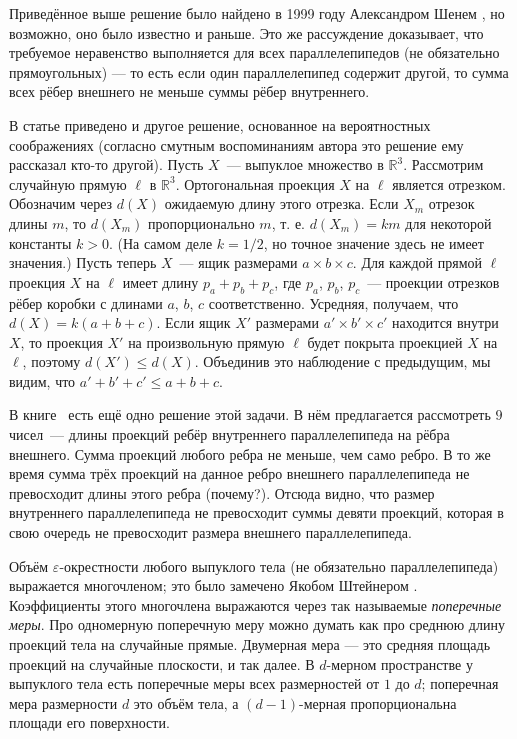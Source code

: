\begin{addedbytheeditors}
Приведённое выше решение было найдено в 1999 году Александром Шенем \cite{shen}, но возможно, оно было известно и раньше.
Это же рассуждение доказывает, что требуемое неравенство выполняется для всех параллелепипедов (не обязательно прямоугольных) --- то есть если один параллелепипед содержит другой, то сумма всех рёбер внешнего не меньше суммы рёбер внутреннего.

В статье \cite{shen}  приведено и другое решение, основанное на вероятностных соображениях (согласно смутным
воспоминаниям автора это решение ему рассказал кто-то другой). Пусть $X$~---  выпуклое множество в $\mathbb{R}^3$. Рассмотрим
случайную прямую $\ell$ в $\mathbb{R}^3$. Ортогональная проекция $X$ на $\ell$ является отрезком. Обозначим через $d(X)$ ожидаемую
длину этого отрезка. Если $X_m$ отрезок длины $m$, то $d(X_m)$ пропорционально $m$, т. е.
$d(X_m) =km$ для некоторой константы $k>0$. (На самом деле $k =1/2$, но точное значение здесь не имеет значения.) Пусть теперь $X$~--- ящик размерами $a\times b\times c$. Для каждой прямой $\ell$ проекция $X$ на $\ell$ имеет длину $p_a + p_b+p_c$, где
$p_a$, $p_b$, $p_c$~---  проекции отрезков рёбер коробки с длинами $a$, $b$, $c$ соответственно. Усредняя, получаем, что
$d(X) = k(a + b + c).$
Если ящик $X'$ размерами $a'\times b'\times c'$ находится внутри $X$, то проекция $X'$ на
произвольную прямую $\ell$ будет покрыта проекцией
$X$ на $\ell$, поэтому $d(X')\le d(X)$. Объединив это наблюдение с предыдущим, мы видим, что
$a'+b'+c'\le a+b+c.$ 


В книге~\cite{Tolpzgo2010} есть ещё одно решение этой задачи. В нём предлагается рассмотреть $9$ чисел~--- длины проекций ребёр внутреннего параллелепипеда на рёбра внешнего. Сумма проекций любого ребра не меньше, чем само ребро. В то же время сумма трёх проекций на данное ребро внешнего параллелепипеда не превосходит длины этого ребра (почему?). Отсюда видно, что размер внутреннего параллелепипеда не превосходит суммы девяти проекций, которая в свою очередь не превосходит размера внешнего параллелепипеда.





Объём $\varepsilon$-окрестности любого выпуклого тела (не обязательно параллелепипеда) выражается многочленом; это было замечено Якобом Штейнером \cite{steiner}.
Коэффициенты этого многочлена выражаются через так называемые \emph{поперечные меры}.
Про одномерную поперечную меру можно думать как про среднюю длину проекций тела на случайные прямые.
Двумерная мера --- это средняя площадь проекций на случайные плоскости, и так далее.
В $d$-мерном пространстве у выпуклого тела есть поперечные меры всех размерностей от $1$ до $d$;
поперечная мера размерности $d$ это объём тела, а $(d-1)$-мерная пропорциональна площади его поверхности.


\end{addedbytheeditors}
